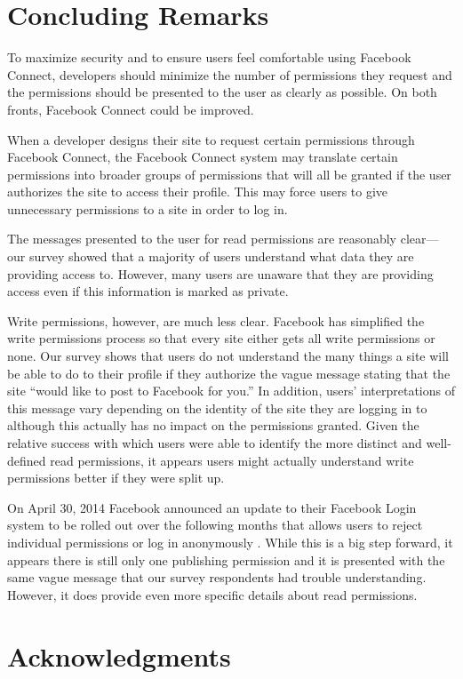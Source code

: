 \documentclass{sig-alternate}
\begin{document}
\section{Concluding Remarks}

To maximize security and to ensure users feel comfortable using Facebook Connect, developers should minimize the number of permissions they request and the permissions should be presented to the user as clearly as possible. On both fronts, Facebook Connect could be improved.

When a developer designs their site to request certain permissions through Facebook Connect, the Facebook Connect system may translate certain permissions into broader groups of permissions that will all be granted if the user authorizes the site to access their profile. This may force users to give unnecessary permissions to a site in order to log in. 

The messages presented to the user for read permissions are reasonably clear---our survey showed that a majority of users understand what data they are providing access to. However, many users are unaware that they are providing access even if this information is marked as private.

Write permissions, however, are much less clear. Facebook has simplified the write permissions process so that every site either gets all write permissions or none. Our survey shows that users do not understand the many things a site will be able to do to their profile if they authorize the vague message stating that the site ``would like to post to Facebook for you.'' In addition, users' interpretations of this message vary depending on the identity of the site they are logging in to although this actually has no impact on the permissions granted. Given the relative success with which users were able to identify the more distinct and well-defined read permissions, it appears users might actually understand write permissions better if they were split up.

On April 30, 2014 Facebook announced an update to their Facebook Login system to be rolled out over the following months that allows users to reject individual permissions or log in anonymously \cite{newlogin}. While this is a big step forward, it appears there is still only one publishing permission and it is presented with the same vague message that our survey respondents had trouble understanding. However, it does provide even more specific details about read permissions. 

\section{Acknowledgments}
\end{document}

